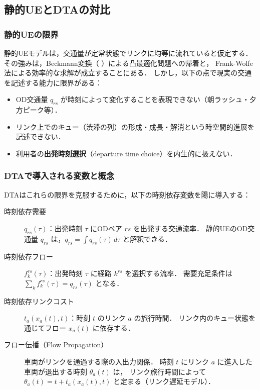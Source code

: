 \subsection{静的UEとDTAの対比}
\label{subsec:static-dta-comparison}

\subsubsection*{静的UEの限界}

静的UEモデルは，交通量が定常状態でリンクに均等に流れていると仮定する．
その強みは，Beckmann変換（ ）による凸最適化問題への帰着と，
Frank-Wolfe 法による効率的な求解が成立することにある．
しかし，以下の点で現実の交通を記述する能力に限界がある：

\begin{itemize}
  \item OD交通量 $q_{rs}$ が時刻によって変化することを表現できない（朝ラッシュ・夕方ピーク等）．
  \item リンク上でのキュー（渋滞の列）の形成・成長・解消という時空間的進展を記述できない．
  \item 利用者の\textbf{出発時刻選択}（departure time choice）を内生的に扱えない．
\end{itemize}

\subsubsection*{DTAで導入される変数と概念}

DTAはこれらの限界を克服するために，以下の時刻依存変数を陽に導入する：

\begin{description}
  \item[時刻依存需要] $q_{rs}(\tau)$：出発時刻 $\tau$ にODペア $rs$ を出発する交通流率．
    静的UEのOD交通量 $q_{rs}$ は，$q_{rs} = \int q_{rs}(\tau)\,d\tau$ と解釈できる．
  \item[時刻依存フロー] $f_k^{rs}(\tau)$：出発時刻 $\tau$ に経路 $k^{rs}$ を選択する流率．
    需要充足条件は $\sum_{k} f_k^{rs}(\tau) = q_{rs}(\tau)$ となる．
  \item[時刻依存リンクコスト] $t_a(x_a(t), t)$：時刻 $t$ のリンク $a$ の旅行時間．
    リンク内のキュー状態を通じてフロー $x_a(t)$ に依存する．
  \item[フロー伝播（Flow Propagation）] 車両がリンクを通過する際の入出力関係．
    時刻 $t$ にリンク $a$ に進入した車両が退出する時刻 $\theta_a(t)$ は，
    リンク旅行時間によって $\theta_a(t) = t + t_a(x_a(t), t)$ と定まる（リンク遅延モデル）．
\end{description}


